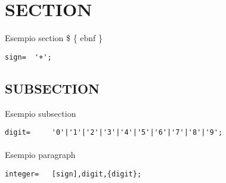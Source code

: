 \documentclass{article}
\begin{document}
    
    \section{SECTION}
      		 
    Esempio section \$ \{ ebnf \} 
    
    \begin{flushleft}
    \begin{lstlisting}[mathescape=true, breaklines=true]
     sign= 	'+';
    \end{lstlisting}
    \end{flushleft}
    
    \subsection{SUBSECTION}
    
    Esempio subsection 
    
    \begin{flushleft}
    \begin{lstlisting}[mathescape=true, breaklines=true]
     digit= 	'0'|'1'|'2'|'3'|'4'|'5'|'6'|'7'|'8'|'9';
    \end{lstlisting}
    \end{flushleft}
    
    \paragraph{}
    
    Esempio paragraph 
    
    \begin{flushleft}
    \begin{lstlisting}[mathescape=true, breaklines=true]
     integer= 	[sign],digit,{digit};
    \end{lstlisting}
    \end{flushleft}
\end{document}
